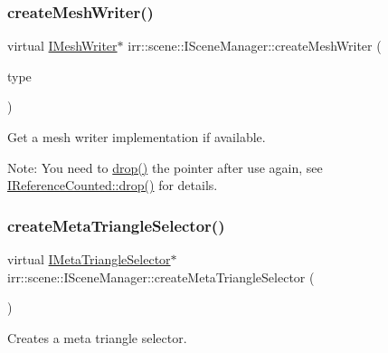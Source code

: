 \subsubsection{\texorpdfstring{create\+Mesh\+Writer()}{createMeshWriter()}}
{\footnotesize\ttfamily virtual \hyperlink{classirr_1_1scene_1_1IMeshWriter}{I\+Mesh\+Writer}$\ast$ irr\+::scene\+::\+I\+Scene\+Manager\+::create\+Mesh\+Writer (\begin{DoxyParamCaption}\item[{\hyperlink{namespaceirr_1_1scene_a431fa15741518ba15f6d5f2608b6cb4e}{E\+M\+E\+S\+H\+\_\+\+W\+R\+I\+T\+E\+R\+\_\+\+T\+Y\+PE}}]{type }\end{DoxyParamCaption})\hspace{0.3cm}{\ttfamily [pure virtual]}}



Get a mesh writer implementation if available. 

Note\+: You need to \hyperlink{classirr_1_1IReferenceCounted_a03856a09355b89d178090c4a5f738543}{drop()} the pointer after use again, see \hyperlink{classirr_1_1IReferenceCounted_a03856a09355b89d178090c4a5f738543}{I\+Reference\+Counted\+::drop()} for details. \mbox{\label{classirr_1_1scene_1_1ISceneManager_aee99e59dc55fe9f8c3507df68f84a9ff}} 
\subsubsection{\texorpdfstring{create\+Meta\+Triangle\+Selector()}{createMetaTriangleSelector()}}
{\footnotesize\ttfamily virtual \hyperlink{classirr_1_1scene_1_1IMetaTriangleSelector}{I\+Meta\+Triangle\+Selector}$\ast$ irr\+::scene\+::\+I\+Scene\+Manager\+::create\+Meta\+Triangle\+Selector (\begin{DoxyParamCaption}{ }\end{DoxyParamCaption})\hspace{0.3cm}{\ttfamily [pure virtual]}}



Creates a meta triangle selector. 

